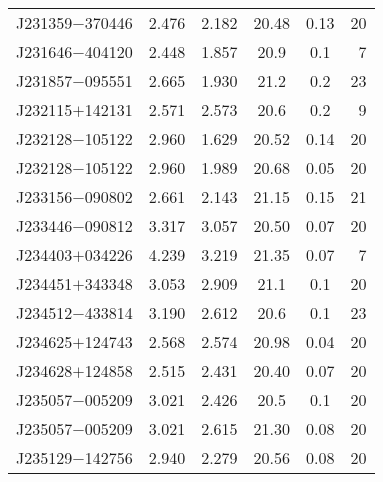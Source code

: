 \begin{table}
\begin{center}
{\begin{tabular}{lccccr}
 J231359$-$370446 &      2.476 &                    2.182 &                   20.48 &               0.13 &                20 \\
 J231646$-$404120 &      2.448 &                    1.857 &                    20.9 &                0.1 &                 7 \\
 J231857$-$095551 &      2.665 &                    1.930 &                    21.2 &                0.2 &                23 \\
 J232115$+$142131 &      2.571 &                    2.573 &                    20.6 &                0.2 &                 9 \\
 J232128$-$105122 &      2.960 &                    1.629 &                   20.52 &               0.14 &                20 \\
 J232128$-$105122 &      2.960 &                    1.989 &                   20.68 &               0.05 &                20 \\
 J233156$-$090802 &      2.661 &                    2.143 &                   21.15 &               0.15 &                21 \\
 J233446$-$090812 &      3.317 &                    3.057 &                   20.50 &               0.07 &                20 \\
 J234403$+$034226 &      4.239 &                    3.219 &                   21.35 &               0.07 &                 7 \\
 J234451$+$343348 &      3.053 &                    2.909 &                    21.1 &                0.1 &                20 \\
 J234512$-$433814 &      3.190 &                    2.612 &                    20.6 &                0.1 &                23 \\
 J234625$+$124743 &      2.568 &                    2.574 &                   20.98 &               0.04 &                20 \\
 J234628$+$124858 &      2.515 &                    2.431 &                   20.40 &               0.07 &                20 \\
 J235057$-$005209 &      3.021 &                    2.426 &                   20.5  &               0.1  &                20 \\
 J235057$-$005209 &      3.021 &                    2.615 &                   21.30 &               0.08 &                20 \\
 J235129$-$142756 &      2.940 &                    2.279 &                   20.56 &               0.08 &                20 \\

\end{tabular}}
\end{center}
\end{table}

